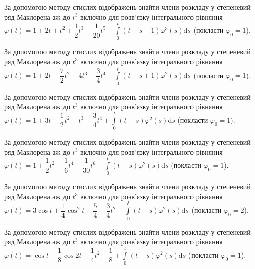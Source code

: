 \documentclass[12pt]{extarticle}
\begin{document}
\begin{Exercise}
За допомогою методу стислих відображень знайти члени розкладу у степеневий ряд Маклорена аж до $t^3$ включно для розв’язку інтегрального рівняння $\varphi (t) = 1 + 2t + t^2 + \dfrac{1}{2}t^3 - \dfrac{1}{20}t^5 +  \int\limits_{0}^{t} (t - s -  1)\varphi^3(s) \mathrm{d}s$ (покласти $\varphi_0 = 1$).
\end{Exercise}

\begin{Exercise}
За допомогою методу стислих відображень знайти члени розкладу у степеневий ряд Маклорена аж до $t^3$ включно для розв’язку інтегрального рівняння $\varphi (t) = 1 + 2t - \dfrac{7}{2} t^2 - 4 t^3 - \dfrac{3}{4} t^4 + \int\limits_{0}^{t} (t - s + 1)\varphi^2(s) \mathrm{d}s$ (покласти $\varphi_0 = 1$).
\end{Exercise}

\begin{Exercise}
За допомогою методу стислих відображень знайти члени розкладу у степеневий ряд Маклорена аж до $t^3$ включно для розв’язку інтегрального рівняння $\varphi (t) = 1 + 3t - \dfrac{1}{2} t^2 - t^3 - \dfrac{3}{4} t^4 + \int\limits_{0}^{t} (t - s) \varphi^2(s) \mathrm{d}s$ (покласти $\varphi_0 = 1$).
\end{Exercise}

\begin{Exercise}
За допомогою методу стислих відображень знайти члени розкладу у степеневий ряд Маклорена аж до $t^3$ включно для розв’язку інтегрального рівняння $\varphi (t) = 1 + \dfrac{1}{2} t^2 - \dfrac{1}{6} t^4 - \dfrac{1}{30} t^6 + \int\limits_{0}^{t} (t - s)\varphi^2(s) \mathrm{d}s$ (покласти $\varphi_0 = 1$).
\end{Exercise}

\begin{Exercise}
За допомогою методу стислих відображень знайти члени розкладу у степеневий ряд Маклорена аж до $t^3$ включно для розв’язку інтегрального рівняння $\varphi (t) = 3 \cos t + \dfrac{1}{4} \cos^2 t - \dfrac{5}{4} - \dfrac{3}{4} t^2 + \int\limits_{0}^{t} (t - s)\varphi^2(s) \mathrm{d}s$ (покласти $\varphi_0 = 2$).
\end{Exercise}

\begin{Exercise}
За допомогою методу стислих відображень знайти члени розкладу у степеневий ряд Маклорена аж до $t^3$ включно для розв’язку інтегрального рівняння $\varphi (t) = \cos t + \dfrac{1}{8} \cos 2t - \dfrac{1}{4} t^2 - \dfrac{1}{8} + \int\limits_{0}^{t} (t-s) \varphi^2(s) \mathrm{d}s$ (покласти $\varphi_0 = 1$).
\end{Exercise}
\end{document}
